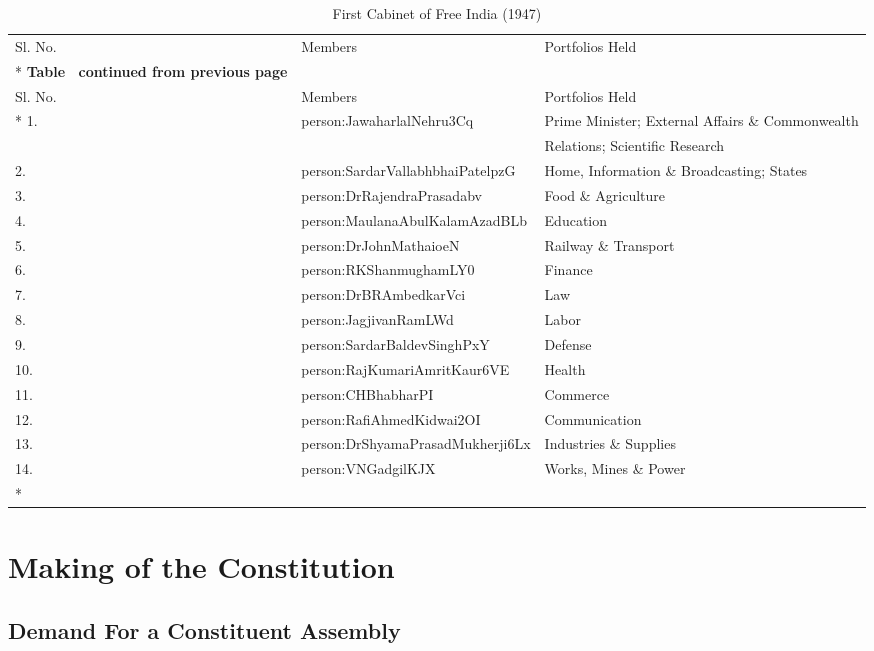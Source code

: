 \begin{longtable}[c]{@{}|p{1cm}|p{4cm}|p{7cm}|@{}}
	\caption{First Cabinet of Free India (1947)}
	\label{tbl:firstCabinetOfFreeIndia}\\
	\toprule
	Sl. No. & Members & Portfolios Held \\* \midrule
	\endfirsthead
	\multicolumn{3}{c}%
	{{\bfseries Table \thetable\ continued from previous page}} \\
	\toprule
	Sl. No. & Members & Portfolios Held \\* \midrule
	\endhead
	\bottomrule
	\endfoot
	\endlastfoot
	1. & \gls{person:JawaharlalNehru3Cq} & Prime Minister; External Affairs \& Commonwealth \\
	&                           & Relations; Scientific Research \\
	2. & \gls{person:SardarVallabhbhaiPatelpzG} & Home, Information \& Broadcasting; States \\
	3. & \gls{person:DrRajendraPrasadabv} & Food \& Agriculture \\
	4. & \gls{person:MaulanaAbulKalamAzadBLb} & Education \\
	5. & \gls{person:DrJohnMathaioeN} & Railway \& Transport \\
	6. & \gls{person:RKShanmughamLY0} & Finance \\
	7. & \gls{person:DrBRAmbedkarVci} & Law \\
	8. & \gls{person:JagjivanRamLWd} & Labor \\
	9. & \gls{person:SardarBaldevSinghPxY} & Defense \\
	10. & \gls{person:RajKumariAmritKaur6VE} & Health \\
	11. & \gls{person:CHBhabharPI} & Commerce \\
	12. & \gls{person:RafiAhmedKidwai2OI} & Communication \\
	13. & \gls{person:DrShyamaPrasadMukherji6Lx} & Industries \& Supplies \\
	14. & \gls{person:VNGadgilKJX} & Works, Mines \& Power \\* \bottomrule
\end{longtable}

\theendnotes
\cleardoublepage
\twocolumn

\chapter{Making of the Constitution}

\section{Demand For a Constituent Assembly}

